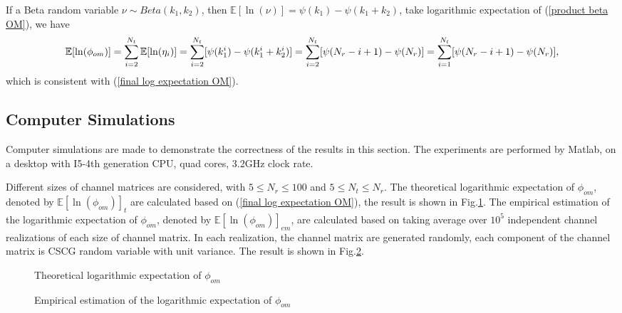 \documentclass[12pt, draftclsnofoot, onecolumn]{IEEEtran}
\begin{document}
If a Beta random variable $\nu\sim Beta(k_{1}, k_{2})$, then $\mathbb{E}[\ln(\nu)]=\psi(k_{1})-\psi(k_{1}+k_{2})$\cite{papoulis2002probability}, take logarithmic expectation of (\ref{product beta OM}), we have 
\begin{equation}
\mathbb{E}[\ln(\phi_{om})]=\sum_{i=2}^{N_{t}}\mathbb{E}[\ln(\eta_{i})]=\sum_{i=2}^{N_{t}}[\psi(k^{i}_{1})-\psi(k^{i}_{1}+k^{i}_{2})]=\sum_{i=2}^{N_{t}}[\psi(N_{r}-i+1)-\psi(N_{r})]\\
=\sum_{i=1}^{N_{t}}[\psi(N_{r}-i+1)-\psi(N_{r})],
\label{final log expectation OM beta}
\end{equation}
which is consistent with (\ref{final log expectation OM}).

\subsection{Computer Simulations}
Computer simulations are made to demonstrate the correctness of the results in this section. The experiments are performed by Matlab, on a desktop with I5-4th generation CPU, quad cores, 3.2GHz clock rate.

Different sizes of channel matrices are considered, with $5\leq N_{r}\leq 100$ and $5\leq N_{t}\leq N_{r}$. The theoretical logarithmic expectation of $\phi_{om}$, denoted by $\mathbb{E}[\ln(\phi_{om})]_{t}$ are calculated based on (\ref{final log expectation OM}), the result is shown in Fig.\ref{flogOMt}. The empirical estimation of the logarithmic expectation of $\phi_{om}$, denoted by $\mathbb{E}[\ln(\phi_{om})]_{em}$, are calculated based on taking average over $10^{5}$ independent channel realizations of each size of channel matrix. In each realization, the channel matrix are generated randomly, each component of the channel matrix is CSCG random variable with unit variance. The result is shown in Fig.\ref{flogOMem}. 
\begin{figure}[htb]
\centering
\def\svgwidth{\columnwidth}

\caption{Theoretical logarithmic expectation of $\phi_{om}$}
\label{flogOMt}
\end{figure}

\begin{figure}[htb]
\centering
\def\svgwidth{\columnwidth}

\caption{Empirical estimation of the logarithmic expectation of $\phi_{om}$}
\label{flogOMem}
\end{figure}
\end{document}
